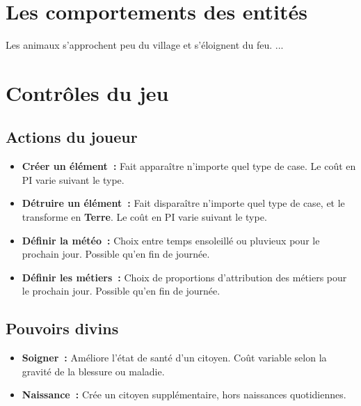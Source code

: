 \documentclass[a4paper]{article}
\begin{document}
\section*{Les comportements des entités}
Les animaux s'approchent peu du village et s'éloignent du feu.
\newline
...


\section*{Contrôles du jeu}

\subsection*{Actions du joueur}
\begin{itemize}
\item \textbf{Créer un élément :} \small{ Fait apparaître n'importe quel type de case. Le coût en PI varie suivant le type.}
\item \textbf{Détruire un élément :} \small{ Fait disparaître n'importe quel type de case, et le transforme en \textbf{Terre}. Le coût en PI varie suivant le type.}
\item \textbf{Définir la météo :} \small{ Choix entre temps ensoleillé ou pluvieux pour le prochain jour. Possible qu'en fin de journée.}
\item \textbf{Définir les métiers :} \small{ Choix de proportions d'attribution des métiers pour le prochain jour. Possible qu'en fin de journée.}
\end{itemize}

\subsection*{Pouvoirs divins}
\begin{itemize}
\item \textbf{Soigner :} \small{ Améliore l'état de santé d'un citoyen. Coût variable selon la gravité de la blessure ou maladie.}
\item \textbf{Naissance :} \small{ Crée un citoyen supplémentaire, hors naissances quotidiennes.}
\end{itemize}
\end{document}
